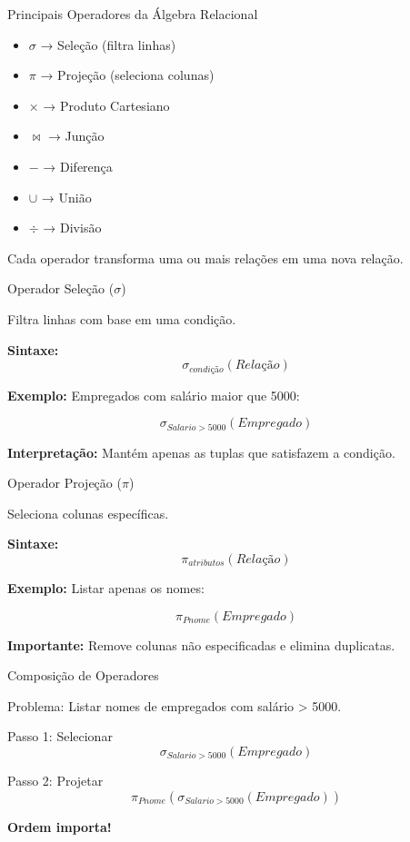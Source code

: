 \documentclass{beamer}
\begin{document}
\begin{frame}{Principais Operadores da Álgebra Relacional}

\begin{itemize}
    \item $\sigma$ → Seleção (filtra linhas)
    \item $\pi$ → Projeção (seleciona colunas)
    \item $\times$ → Produto Cartesiano
    \item $\Join$ → Junção
    \item $-$ → Diferença
    \item $\cup$ → União
    \item $\div$ → Divisão
\end{itemize}

Cada operador transforma uma ou mais relações
em uma nova relação.

\end{frame}





\begin{frame}{Operador Seleção ($\sigma$)}

Filtra linhas com base em uma condição.

\textbf{Sintaxe:}
\[
\sigma_{condição}(Relação)
\]

\textbf{Exemplo:}
Empregados com salário maior que 5000:

\[
\sigma_{Salario > 5000}(Empregado)
\]

\textbf{Interpretação:}
Mantém apenas as tuplas que satisfazem a condição.

\end{frame}





\begin{frame}{Operador Projeção ($\pi$)}

Seleciona colunas específicas.

\textbf{Sintaxe:}
\[
\pi_{atributos}(Relação)
\]

\textbf{Exemplo:}
Listar apenas os nomes:

\[
\pi_{Pnome}(Empregado)
\]

\textbf{Importante:}
Remove colunas não especificadas
e elimina duplicatas.

\end{frame}





\begin{frame}{Composição de Operadores}

Problema:
Listar nomes de empregados com salário > 5000.

Passo 1: Selecionar
\[
\sigma_{Salario > 5000}(Empregado)
\]

Passo 2: Projetar
\[
\pi_{Pnome}(\sigma_{Salario > 5000}(Empregado))
\]

\textbf{Ordem importa!}

\end{frame}
\end{document}

